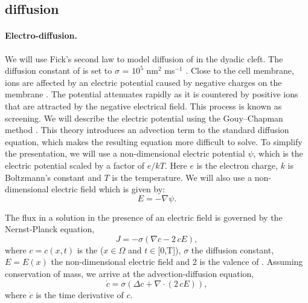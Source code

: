 \subsection{\Ca diffusion}
\label{sec:hake:ca-diffusion}

\paragraph{Electro-diffusion.}
  
  

We will use Fick's second law to model diffusion of \Ca in the dyadic
cleft. The diffusion constant of \Ca is set to $\sigma$ = $10^5$
nm$^2$ ms$^{-1}$ \citep{LangerPeskoff1996}. Close to the cell membrane,
ions are affected by an electric potential caused by negative charges
on the membrane
\citep{McLaughlinSzaboEisenman1971,LangnerCafisoMarceljaEtAl1990}. The
potential attenuates rapidly as it is countered by positive ions that
are attracted by the negative electrical field. This process is known
as screening. We will describe the electric potential using the
Gouy--Chapman method \citep{Grahame1947}. This theory introduces an
advection term to the standard diffusion equation, which makes the
resulting equation more difficult to solve. To simplify the
presentation, we will use a non-dimensional electric potential $\psi$,
which is the electric potential scaled by a factor of $e/kT$. Here $e$
is the electron charge, $k$ is Boltzmann's constant and $T$ is the
temperature. We will also use a non-dimensional electric field which
is given by:
\begin{equation}
  \label{eq:hake:electric_field}
  E=-\nabla\psi.
\end{equation}

The \Ca flux in a solution in the presence of an electric field is
governed by the Nernst-Planck equation,
\begin{equation}
  \label{eq:hake:nernst-planck}
  J = -\sigma\left(\nabla c-2\,cE\right),
\end{equation}
where $c = c(x,t)$ is the \CaC ($x\in\Omega$ and $t\in$[0,T]),
$\sigma$ the diffusion constant, $E = E(x)$ the non-dimensional
electric field and 2 is the valence of \Ca. Assuming conservation of
mass, we arrive at the advection-diffusion equation,
\begin{equation}
  \label{eq:hake:advection-diffusion}
  \dot{c}=\sigma\left(\Delta c + \nabla\cdot\left(2\,cE\right)\right),
\end{equation}
where $\dot{c}$ is the time derivative of $c$.

